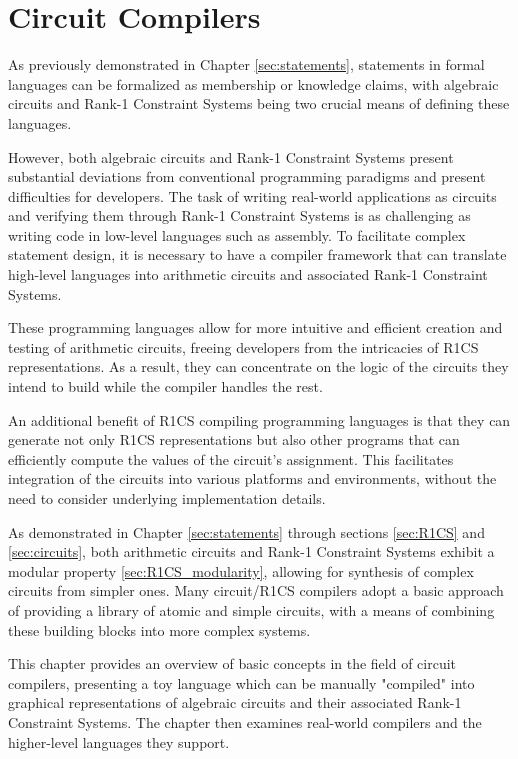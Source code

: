 \chapter{Circuit Compilers}\label{chap:circuit-compilers}
As previously demonstrated in Chapter \ref{sec:statements}, statements in formal languages can be formalized as membership or knowledge claims, with algebraic circuits and Rank-1 Constraint Systems being two crucial means of defining these languages.

However, both algebraic circuits and Rank-1 Constraint Systems present substantial deviations from conventional programming paradigms and present difficulties for developers. The task of writing real-world applications as circuits and verifying them through Rank-1 Constraint Systems is as challenging as writing code in low-level languages such as assembly. To facilitate complex statement design, it is necessary to have a compiler framework that can translate high-level languages into arithmetic circuits and associated Rank-1 Constraint Systems.

These programming languages allow for more intuitive and efficient creation and testing of arithmetic circuits, freeing developers from the intricacies of R1CS representations. As a result, they can concentrate on the logic of the circuits they intend to build while the compiler handles the rest.

An additional benefit of R1CS compiling programming languages is that they can generate not only R1CS representations but also other programs that can efficiently compute the values of the circuit's assignment. This facilitates integration of the circuits into various platforms and environments, without the need to consider underlying implementation details.

As demonstrated in Chapter \ref{sec:statements} through sections \ref{sec:R1CS} and \ref{sec:circuits}, both arithmetic circuits and Rank-1 Constraint Systems exhibit a modular property \ref{sec:R1CS_modularity}, allowing for synthesis of complex circuits from simpler ones. Many circuit/R1CS compilers adopt a basic approach of providing a library of atomic and simple circuits, with a means of combining these building blocks into more complex systems.

This chapter provides an overview of basic concepts in the field of circuit compilers, presenting a toy language which can be manually "compiled" into graphical representations of algebraic circuits and their associated Rank-1 Constraint Systems. The chapter then examines real-world compilers and the higher-level languages they support.


